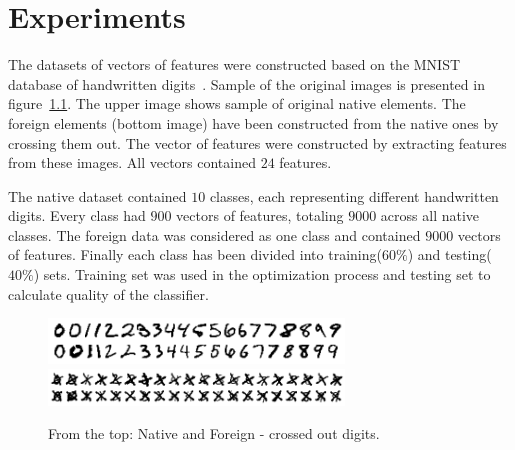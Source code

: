 \documentclass{mini}
\begin{document}
\chapter{Experiments}\label{chap:experiments}






The datasets of vectors of features were constructed based on the MNIST database of handwritten digits~\cite{digits_db}. Sample of the original images is presented in figure~\ref{fig:native_foreign_png}. The upper image shows sample of original native elements. The foreign elements (bottom image) have been constructed from the native ones by crossing them out. The vector of features were constructed by extracting features from these images. All vectors contained $24$ features.

The native dataset contained $10$ classes, each representing different handwritten digits. Every class had $900$ vectors of features, totaling $9000$ across all native classes. The foreign data was considered as one class and contained $9000$ vectors of features. Finally each class has been divided into training($60\%$) and testing($40\%$) sets. Training set was used in the optimization process and testing set to calculate quality of the classifier.

\begin{figure}[H]
    \includegraphics[width=0.7\textwidth]{./images/native.png}
    \includegraphics[width=0.7\textwidth]{./images/crossedout.png}
    \caption{From the top: Native and Foreign - crossed out digits.}
    \label{fig:native_foreign_png}
\end{figure}
\end{document}
